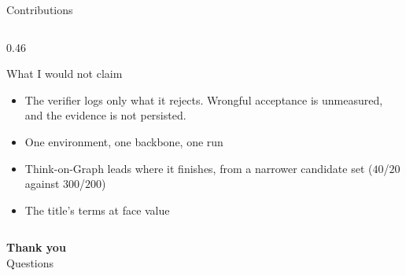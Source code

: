 \begin{frame}{Contributions}
\begin{columns}[T]
\begin{column}{0.46\textwidth}
\begin{block}{What I would not claim}
        \small\let\raggedright\agrraggedright
        \begin{itemize}\setlength{\itemsep}{0pt}
          \item The verifier logs only what it \alert{rejects}. Wrongful
            acceptance is unmeasured, and the evidence is not persisted.
          \item One environment, one backbone, one run
          \item Think-on-Graph leads where it finishes, from a
            \alert{narrower candidate set} ($40$/$20$ against
            $300$/$200$)
          \item The title's terms at face value
        \end{itemize}
      \end{block}
    \end{column}
  \end{columns}
  \centrebody
\end{frame}

{
\begin{frame}[plain]
  \vfill
  \centering
  {\Large\bfseries\color{agrdark} Thank you}\\[4mm]
  {\large Questions}
  \vfill
\end{frame}}
